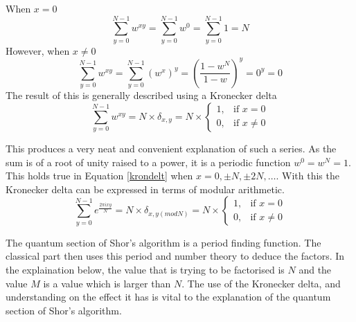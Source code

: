 \documentclass[authoryearcitations]{UoYCSproject}
\begin{document}
When $x=0$
\begin{equation}
 \sum_{y=0}^{N-1}w^{xy}=\sum_{y=0}^{N-1}w^{0}=\sum_{y=0}^{N-1}1 = N
\end{equation}
However, when $x\neq{0}$
\begin{equation}
 \sum_{y=0}^{N-1}w^{xy}=\sum_{y=0}^{N-1}(w^x)^y=(\frac{1-w^N}{1-w})^y=0^y=0
\end{equation}
The result of this is generally described using a Kronecker delta
\begin{equation}
 \sum_{y=0}^{N-1}w^{xy}=N\times\delta_{x,y}=N\times
\left\{
  \begin{array}{cc} 1, & \mbox{if } x={0}\\ 
  0, & \mbox{if } x\neq{0}\end{array}
\right.
\label{krondelt}
\end{equation}

This produces a very neat and convenient explanation of such a series.
As the sum is of a root of unity raised to a power, it is a periodic function $w^0=w^N=1$.
This holds true in Equation \ref{krondelt} when $x=0,\pm{N},\pm{2N},\dots$.
With this the Kronecker delta can be expressed in terms of modular arithmetic.
\begin{equation}
 \sum_{y=0}^{N-1}e^{\frac{2\pi{i}xy}{N}}=N\times\delta_{x,y (mod N)}=N\times
\left\{
  \begin{array}{cc} 1, & \mbox{if } x={0}\\ 
  0, & \mbox{if } x\neq{0}\end{array}
\right.
\label{krondelt}
\end{equation}

The quantum section of Shor's algorithm is a period finding function.
The classical part then uses this period and number theory to deduce the factors.
In the explaination below, the value that is trying to be factorised is $N$ and the value $M$ is a value which is larger than $N$.
The use of the Kronecker delta, and understanding on the effect it has is vital to the explanation of the quantum section of Shor's algorithm.
\end{document}
